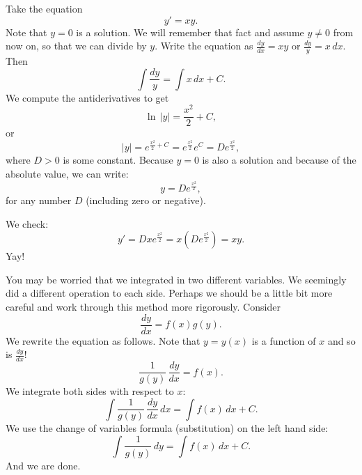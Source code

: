 \begin{example} \label{example:yprimeisxy}
Take the equation
\begin{equation*}
y' = xy .
\end{equation*}
Note that $y=0$ is a solution.  We will remember that fact and
assume $y \not =0$ from now on, so that we can divide by $y$.
Write the equation as $\frac{dy}{dx} = xy$ or
$\frac{dy}{y} = x \, dx$.
Then
\begin{equation*}
\int \frac{dy}{y} = \int x\,dx + C .
\end{equation*}
We compute the antiderivatives to get
\begin{equation*}
\ln \, \lvert y\rvert = \frac{x^2}{2} + C ,
\end{equation*}
or
\begin{equation*}
\lvert y \rvert = e^{\frac{x^2}{2} + C} = e^{\frac{x^2}{2}} e^C = D e^{\frac{x^2}{2}} ,
\end{equation*}
where $D > 0$ is some constant.  Because $y=0$ is also a solution and because
of the absolute value, we can write:
\begin{equation*}
y = D e^{\frac{x^2}{2}} ,
\end{equation*}
for any number $D$ (including zero or negative).

We check:
\begin{equation*}
y' = D x e^{\frac{x^2}{2}} = x \left( D e^{\frac{x^2}{2}} \right) = xy .
\end{equation*}
Yay!
\end{example}

You may be worried that we 
integrated in two different variables.
We seemingly did a different operation to each side.
Perhaps we should be a little bit more careful
and work through this method more rigorously.
Consider
\begin{equation*}
\frac{dy}{dx} = f(x)g(y) .
\end{equation*}
We rewrite the equation as follows.
Note that $y = y(x)$ is a function of $x$ and so is
$\frac{dy}{dx}$!
\begin{equation*}
\frac{1}{g(y)}\,\frac{dy}{dx} = f(x) .
\end{equation*}
We integrate both sides with respect to $x$:
\begin{equation*}
\int \frac{1}{g(y)}\,\frac{dy}{dx} \,dx = \int f(x) \,dx + C .
\end{equation*}
We use the change of variables formula (substitution) on the left hand side:
\begin{equation*}
\int \frac{1}{g(y)}\,dy = \int f(x) \,dx + C .
\end{equation*}
And we are done.

